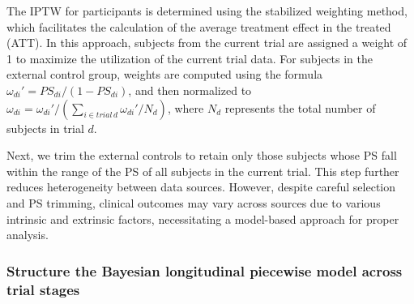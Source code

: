 The \ac{IPTW} for participants is determined using the stabilized weighting method, which facilitates the calculation of the average treatment effect in the treated (ATT). In this approach, subjects from the current trial are assigned a weight of 1 to maximize the utilization of the current trial data. For subjects in the external control group, weights are computed using the formula $\omega_{di}' = PS_{di} / (1 - PS_{di})$, and then normalized to $\omega_{di} = \omega_{di}' / (\sum_{i \in trial\, d} \omega_{di}' / N_{d})$, where $N_d$ represents the total number of subjects in trial $d$.

Next, we trim the external controls to retain only those subjects whose \ac{PS} fall within the range of the \ac{PS} of all subjects in the current trial. This step further reduces heterogeneity between data sources. However, despite careful selection and \ac{PS} trimming, clinical outcomes may vary across sources due to various intrinsic and extrinsic factors, necessitating a model-based approach for proper analysis.

\subsubsection{Structure the Bayesian longitudinal piecewise model across trial stages}

